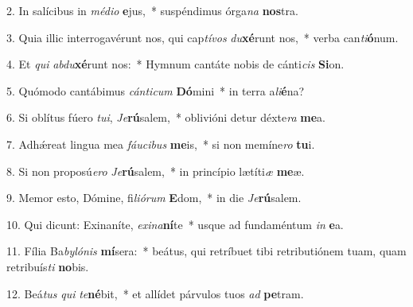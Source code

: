 2. In salícibus in \textit{mé}\textit{di}\textit{o} \textbf{e}jus,~*  suspéndimus órga\textit{na} \textbf{nos}tra.\

3. Quia illic interrogavérunt nos, qui cap\textit{tí}\textit{vos} \textit{du}\textbf{xé}runt nos,~*  verba can\textit{ti}\textbf{ó}num.\

4. Et \textit{qui} \textit{ab}\textit{du}\textbf{xé}runt nos:~*  Hymnum cantáte nobis de cánti\textit{cis} \textbf{Si}on.\

5. Quómodo cantábimus \textit{cán}\textit{ti}\textit{cum} \textbf{Dó}mini~*  in terra a\textit{li}\textbf{é}na?\

6. Si oblítus fúero \textit{tu}\textit{i}, \textit{Je}\textbf{rú}salem,~*  oblivióni detur déxte\textit{ra} \textbf{me}a.\

7. Adhǽreat lingua mea \textit{fáu}\textit{ci}\textit{bus} \textbf{me}is,~*  si non memíne\textit{ro} \textbf{tu}i.\

8. Si non proposú\textit{e}\textit{ro} \textit{Je}\textbf{rú}salem,~*  in princípio lætíti\textit{æ} \textbf{me}æ.\

9. Memor esto, Dómine, fi\textit{li}\textit{ó}\textit{rum} \textbf{E}dom,~*  in die \textit{Je}\textbf{rú}salem.\

10. Qui dicunt: Exinaníte, \textit{ex}\textit{i}\textit{na}\textbf{ní}te~*  usque ad fundaméntum \textit{in} \textbf{e}a.\

11. Fília Ba\textit{by}\textit{ló}\textit{nis} \textbf{mí}sera:~*  beátus, qui retríbuet tibi retributiónem tuam, quam retribuís\textit{ti} \textbf{no}bis.\

12. Beá\textit{tus} \textit{qui} \textit{te}\textbf{né}bit,~*  et allídet párvulos tuos \textit{ad} \textbf{pe}tram.\

